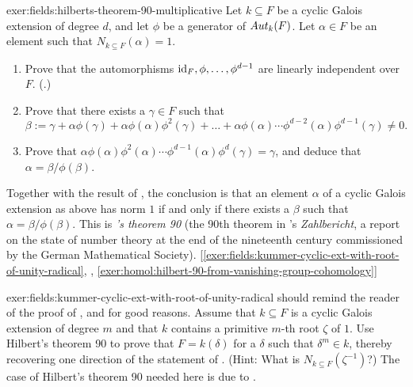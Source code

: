 \begin{exer}{}{exer:fields:hilberts-theorem-90-multiplicative}
  Let $k \subseteq F$ be a cyclic Galois extension of degree $d$, and
  let $\phi$ be a generator of $Aut_k(F)$. Let $\alpha \in F$ be an
  element such that $N_{k \subseteq F}(\alpha) = 1$.
  \begin{enumerate}[label=(\roman*)]
  \item Prove that the automorphisms $\operatorname{id}_F, \phi, \dots, \phi^{d-1}$
    are linearly independent over
    $F$. (.)
  \item Prove that there exists a $\gamma \in F$ such that
    \[
      \beta := \gamma + \alpha\phi(\gamma) +
      \alpha\phi(\alpha)\phi^2(\gamma) + \dots +
      \alpha\phi(\alpha)\cdots\phi^{d-2}(\alpha)\phi^{d-1}(\gamma)
      \neq 0.
    \]
  \item Prove that
    $\alpha\phi(\alpha)\phi^2(\alpha)\cdots\phi^{d-1}(\alpha)\phi^d(\gamma)
    = \gamma$, and deduce that $\alpha = \beta/\phi(\beta)$.
  \end{enumerate}
  Together with the result of
  , the
  conclusion is that an element $\alpha$ of a cyclic Galois extension
  as above has norm $1$ if and only if there exists a $\beta$ such
  that $\alpha = \beta/\phi(\beta)$.  This is \emph{'s
    theorem 90} (the 90th theorem in 's
  \emph{Zahlbericht}, a report on the state of number theory at the
  end of the nineteenth century commissioned by the German
  Mathematical
  Society). [\ref{exer:fields:kummer-cyclic-ext-with-root-of-unity-radical},
  ,
  \ref{exer:homol:hilbert-90-from-vanishing-group-cohomology}]
\end{exer}
\begin{exer}{}{exer:fields:kummer-cyclic-ext-with-root-of-unity-radical}
   should remind
  the reader of the proof of , and for good
  reasons. Assume that $k \subseteq F$ is a cyclic Galois extension of
  degree $m$ and that $k$ contains a primitive $m$-th root $\zeta$ of
  $1$. Use Hilbert's theorem 90 to prove that $F = k(\delta)$ for a
  $\delta$ such that $\delta^m \in k$, thereby recovering one
  direction of the statement of . (Hint: What
  is $N_{k \subseteq F}(\zeta^{-1})$?) The case of Hilbert's theorem
  90 needed here is due to .
\end{exer}
